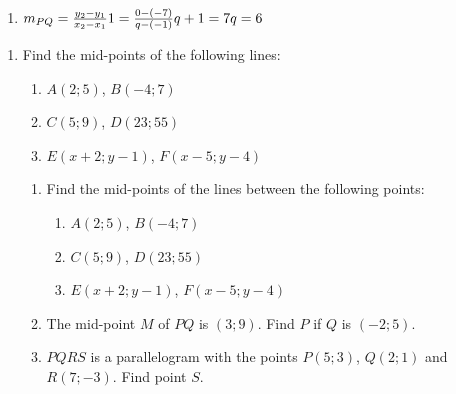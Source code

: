 \begin{solutions}{}
{\begin{enumerate}[itemsep=5pt, label=\textbf{\arabic*}. ]
\item $m_{PQ} = \frac{y_2-y_1}{x_2-x_1}\\
  1 = \frac{0-(-7)}{q-(-1)}\\
  q+1 = 7\\
  q = 6\\$
\end{enumerate}}
\end{solutions}

\begin{exercises}{}{
\begin{enumerate}[itemsep=5pt, label=\textbf{\arabic*}. ]
\item Find the mid-points of the following lines:
  \begin{enumerate}[noitemsep, label=\textbf{(\alph*)} ]
\item $A(2;5)$, $B(-4;7)$
\item $C(5;9)$, $D(23;55)$
\item $E(x+2;y-1)$, $F(x-5;y-4)$
\end{enumerate}
\begin{exercises}{}{
    \begin{enumerate}[itemsep=5pt, label=\textbf{\arabic*}. ]
    \item Find the mid-points of the lines between the following points:
      \begin{enumerate}[noitemsep, label=\textbf{(\alph*)} ]
      \item $A(2;5)$, $B(-4;7)$
      \item $C(5;9)$, $D(23;55)$
      \item $E(x+2;y-1)$, $F(x-5;y-4)$
      \end{enumerate}
    \item The mid-point $M$ of $PQ$ is $(3;9)$. Find $P$ if $Q$ is $(-2;5)$.
    \item $PQRS$ is a parallelogram with the points $P(5;3)$, $Q(2;1)$ and $R(7;-3)$. Find point $S$.
    \end{enumerate}
}
\end{exercises}    


\end{enumerate}}
\end{exercises}
